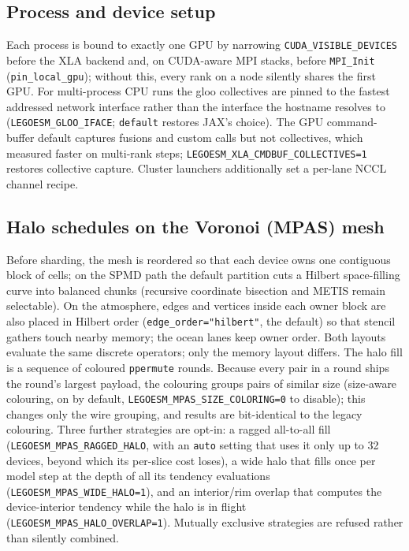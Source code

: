 \documentclass[11pt,a4paper]{article}
\begin{document}
\subsection{Process and device setup}
Each process is bound to exactly one GPU by narrowing \texttt{CUDA\_VISIBLE\_DEVICES} before the XLA backend and, on CUDA-aware MPI stacks, before \texttt{MPI\_Init} (\texttt{pin\_local\_gpu}); without this, every rank on a node silently shares the first GPU.  For multi-process CPU runs the gloo collectives are pinned to the fastest addressed network interface rather than the interface the hostname resolves to (\texttt{LEGOESM\_GLOO\_IFACE}; \texttt{default} restores JAX's choice).  The GPU command-buffer default captures fusions and custom calls but not collectives, which measured faster on multi-rank steps; \texttt{LEGOESM\_XLA\_CMDBUF\_COLLECTIVES=1} restores collective capture.  Cluster launchers additionally set a per-lane NCCL channel recipe.

\subsection{Halo schedules on the Voronoi (MPAS) mesh}
Before sharding, the mesh is reordered so that each device owns one contiguous block of cells; on the SPMD path the default partition cuts a Hilbert space-filling curve into balanced chunks (recursive coordinate bisection and METIS remain selectable).  On the atmosphere, edges and vertices inside each owner block are also placed in Hilbert order (\texttt{edge\_order="hilbert"}, the default) so that stencil gathers touch nearby memory; the ocean lanes keep owner order.  Both layouts evaluate the same discrete operators; only the memory layout differs.  The halo fill is a sequence of coloured \texttt{ppermute} rounds.  Because every pair in a round ships the round's largest payload, the colouring groups pairs of similar size (size-aware colouring, on by default, \texttt{LEGOESM\_MPAS\_SIZE\_COLORING=0} to disable); this changes only the wire grouping, and results are bit-identical to the legacy colouring.  Three further strategies are opt-in: a ragged all-to-all fill (\texttt{LEGOESM\_MPAS\_RAGGED\_HALO}, with an \texttt{auto} setting that uses it only up to 32 devices, beyond which its per-slice cost loses), a wide halo that fills once per model step at the depth of all its tendency evaluations (\texttt{LEGOESM\_MPAS\_WIDE\_HALO=1}), and an interior/rim overlap that computes the device-interior tendency while the halo is in flight (\texttt{LEGOESM\_MPAS\_HALO\_OVERLAP=1}).  Mutually exclusive strategies are refused rather than silently combined.
\end{document}
